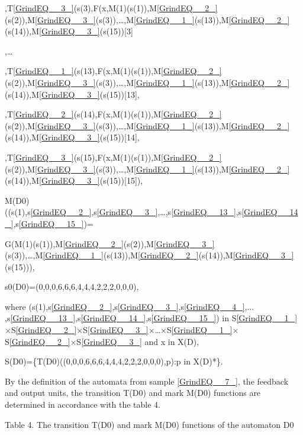 \documentclass{article}
\begin{document}
,T\eqref{GrindEQ__3_}(s(3),F(x,M(1)(s(1)),M\eqref{GrindEQ__2_}(s(2)),M\eqref{GrindEQ__3_}(s(3)),\dots ,M\eqref{GrindEQ__1_}(s(13)),M\eqref{GrindEQ__2_}(s(14)),M\eqref{GrindEQ__3_}(s(15))[3]

,\dots

,T\eqref{GrindEQ__1_}(s(13),F(x,M(1)(s(1)),M\eqref{GrindEQ__2_}(s(2)),M\eqref{GrindEQ__3_}(s(3)),\dots ,M\eqref{GrindEQ__1_}(s(13)),M\eqref{GrindEQ__2_}(s(14)),M\eqref{GrindEQ__3_}(s(15))[13],

,T\eqref{GrindEQ__2_}(s(14),F(x,M(1)(s(1)),M\eqref{GrindEQ__2_}(s(2)),M\eqref{GrindEQ__3_}(s(3)),\dots ,M\eqref{GrindEQ__1_}(s(13)),M\eqref{GrindEQ__2_}(s(14)),M\eqref{GrindEQ__3_}(s(15))[14],

,T\eqref{GrindEQ__3_}(s(15),F(x,M(1)(s(1)),M\eqref{GrindEQ__2_}(s(2)),M\eqref{GrindEQ__3_}(s(3)),\dots ,M\eqref{GrindEQ__1_}(s(13)),M\eqref{GrindEQ__2_}(s(14)),M\eqref{GrindEQ__3_}(s(15))[15]),

M(D0)((s(1),s\eqref{GrindEQ__2_},s\eqref{GrindEQ__3_},\dots ,s\eqref{GrindEQ__13_},s\eqref{GrindEQ__14_},s\eqref{GrindEQ__15_})=

G(M(1)(s(1)),M\eqref{GrindEQ__2_}(s(2)),M\eqref{GrindEQ__3_}(s(3)),\dots ,M\eqref{GrindEQ__1_}(s(13)),M\eqref{GrindEQ__2_}(s(14)),M\eqref{GrindEQ__3_}(s(15))),

s0(D0)=(0,0,0,6,6,6,4,4,4,2,2,2,0,0,0),

where (s(1),s\eqref{GrindEQ__2_},s\eqref{GrindEQ__3_},s\eqref{GrindEQ__4_},... ,s\eqref{GrindEQ__13_},s\eqref{GrindEQ__14_},s\eqref{GrindEQ__15_}) in S\eqref{GrindEQ__1_}$\times$S\eqref{GrindEQ__2_}$\times$S\eqref{GrindEQ__3_}$\times$\dots $\times$S\eqref{GrindEQ__1_}$\times$S\eqref{GrindEQ__2_}$\times$S\eqref{GrindEQ__3_} and x in X(D),

S(D0)=\{T(D0)((0,0,0,6,6,6,4,4,4,2,2,2,0,0,0),p):p in X(D)*\}.

By the definition of the automata from sample \eqref{GrindEQ__7_}, the feedback and output units, the transition T(D0) and mark M(D0) functions are determined in accordance with the table 4.

Table 4. The transition T(D0) and mark M(D0) functions of the automaton D0
\end{document}
